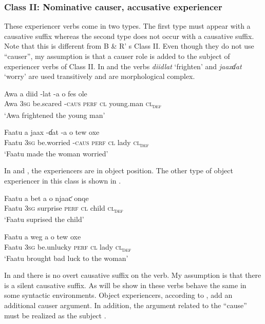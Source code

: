 \documentclass[output=paper]{langscibook}
\begin{document}
\subsubsection{Class II: Nominative causer, accusative experiencer} 

These experiencer verbs come in two types. The first type must appear with a causative suffix whereas the second type does not occur with a causative suffix. Note that this is different from B \& R’ s Class II. Even though they do not use “causer”, my assumption is that a causer role is added to the subject of experiencer verbs of Class II. In  and  the verbs \textit{diidlat} ‘frighten’ and \textit{jaaxɗat} ‘worry’ are used transitively and are morphological complex. 

\ea \label{ex:tamba:5}
\ea \label{ex:tamba:5a}
\gll Awa  a    diid       {}-lat    -a      o     fes              ole\\
    Awa  \textsc{3sg} be.scared -\textsc{caus}   \textsc{perf}  \textsc{cl}    young.man  \textsc{cl\textsubscript{def}}\\
\glt `Awa frightened the young man'

\ex \label{ex:tamba:5b}
\gll Faatu   a       jaax       {}-ɗat    {}-a       o       tew  oxe\\
    Faatu    \textsc{3sg}   be.worried   {}-\textsc{caus}   \textsc{perf}    \textsc{cl}  lady  \textsc{cl\textsubscript{def}}\\
\glt `Faatu made the woman worried'
\z
\z

In  and , the experiencers are in  object position. The other type of object experiencer in this class is shown in .


\ea \label{ex:tamba:6}
\ea \label{ex:tamba:6a}
\gll Faatu   a        bet         a        o  njaaƈ   onqe  \\
    Faatu   \textsc{3sg}    surprise     \textsc{perf}  \textsc{cl} child   \textsc{cl\textsubscript{def}} \\
\glt `Faatu suprised the child'

\ex \label{ex:tamba:6b}
\gll Faatu  a  weg      a  o  tew    oxe\\
    Faatu  \textsc{3sg}  be.unlucky    \textsc{perf}  \textsc{cl}  lady      \textsc{cl\textsubscript{def}}\\
\glt `Faatu brought bad luck to the woman'
\z
\z 

In  and  there is no overt causative suffix on the verb. My assumption is  that there is a silent causative suffix. As will be show in  these verbs behave the same in some syntactic environments. Object experiencers, according to \citet{Pesetsky1995}, add an additional causer argument. In addition, the argument related to the “cause” must be realized as the subject \citep{Grimshaw1990}.
\end{document}

